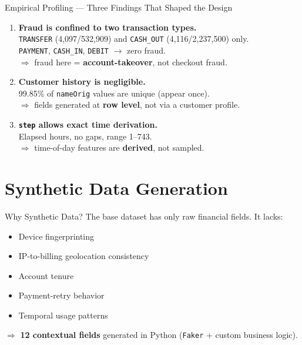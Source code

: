 \documentclass[aspectratio=169]{beamer}
\begin{document}
\begin{frame}{Empirical Profiling --- Three Findings That Shaped the Design}
\begin{enumerate}
    \item \textbf{Fraud is confined to two transaction types.}\\
    \texttt{TRANSFER} (4,097/532,909) and \texttt{CASH\_OUT} (4,116/2,237,500) only.\\
    \texttt{PAYMENT}, \texttt{CASH\_IN}, \texttt{DEBIT} \(\rightarrow\) zero fraud.\\
    \(\Rightarrow\) fraud here = \textbf{account-takeover}, not checkout fraud.
    \vspace{0.2cm}
    \item \textbf{Customer history is negligible.}\\
    99.85\% of \texttt{nameOrig} values are unique (appear once).\\
    \(\Rightarrow\) fields generated at \textbf{row level}, not via a customer profile.
    \vspace{0.2cm}
    \item \textbf{\texttt{step} allows exact time derivation.}\\
    Elapsed hours, no gaps, range 1--743.\\
    \(\Rightarrow\) time-of-day features are \textbf{derived}, not sampled.
\end{enumerate}
\end{frame}

\section{Synthetic Data Generation}

\begin{frame}{Why Synthetic Data?}
The base dataset has only raw financial fields. It lacks:
\begin{itemize}
    \item Device fingerprinting
    \item IP-to-billing geolocation consistency
    \item Account tenure
    \item Payment-retry behavior
    \item Temporal usage patterns
\end{itemize}
\vspace{0.3cm}
\(\Rightarrow\) \textbf{12 contextual fields} generated in Python (\texttt{Faker} + custom business logic).
\end{frame}
\end{document}
